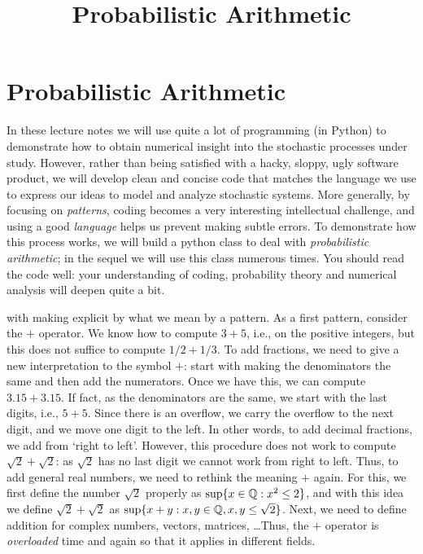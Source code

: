 \documentclass[queueing-book]{subfiles}
\date{}
\title{Probabilistic Arithmetic}
\begin{document}
\maketitle
\section{Probabilistic Arithmetic}
\label{sec:org4508552}

In these lecture notes we will use quite a lot of programming (in Python) to demonstrate how to obtain numerical insight into the stochastic processes under study.
However, rather than being satisfied with a hacky, sloppy, ugly software product, we will develop clean and concise code that matches the language we use to express our ideas to model and analyze stochastic systems.
More generally, by focusing on \emph{patterns}, coding becomes a very interesting intellectual challenge, and using a good \emph{language} helps us prevent making subtle errors.
To demonstrate how this process works, we will build a python class to deal with \emph{probabilistic arithmetic}; in the sequel we will use this class numerous times.
You should read the code well: your understanding of coding, probability theory and numerical analysis will deepen quite a bit.

 with making explicit by what we mean by a pattern.
As a first pattern, consider the \(+\) operator.
We know how to compute \(3+5\), i.e., on the positive integers, but this does not suffice to compute \(1/2 + 1/3\).
To add fractions, we need to give a new interpretation to the symbol \(+\): start with making the denominators the same and then add the numerators.
Once we have this, we can compute \(3.15 + 3.15\).
If fact, as the denominators are the same, we start with the last digits, i.e., \(5+5\).
Since there is an overflow, we carry the overflow to the next digit, and we move one digit to the left.
In other words, to add decimal fractions, we add from `right to left'.
However, this procedure does not work to compute \(\sqrt 2 + \sqrt 2\): as \(\sqrt 2\) has no last digit we cannot work from right to left.
Thus, to add general real numbers, we need to rethink the meaning \(+\) again.
For this, we first define the number \(\sqrt 2\) properly as \(\sup\{x \in \mathbb{Q} : x^{2} \leq 2\}\), and with this idea we define \(\sqrt 2 + \sqrt 2\) as \(\sup\{x + y : x, y \in \mathbb{Q}, x, y \leq \sqrt 2\}\).
Next, we need to define addition for complex numbers, vectors, matrices, \ldots Thus, the \(+\) operator is \emph{overloaded} time and again so that it applies in different fields.
\end{document}
